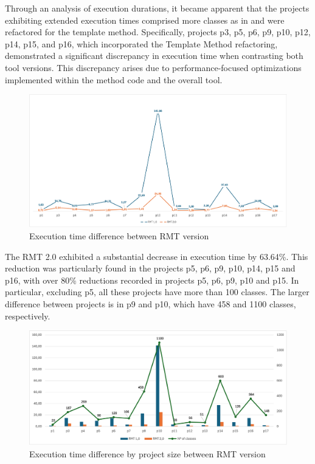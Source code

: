 

Through an analysis of execution durations, it became apparent that the projects exhibiting extended execution times comprised more classes as in  and were refactored for the template method. Specifically, projects p3, p5, p6, p9, p10, p12, p14, p15, and p16, which incorporated the Template Method refactoring, demonstrated a significant discrepancy in execution time when contrasting both tool versions. This discrepancy arises due to performance-focused optimizations implemented within the method code and the overall tool.

\begin{figure}[ht!]
\caption{Execution time difference between RMT version}
\label{fig-time-chart}
\includegraphics[width =\textwidth]{Chapter-5/Figures/time-diff.png}
\end{figure}
\FloatBarrier

The RMT 2.0 exhibited a substantial decrease in execution time by 63.64\%. This reduction was particularly found in the projects p5, p6, p9, p10, p14, p15 and p16, with over 80\% reductions recorded in projects p5, p6, p9, p10 and p15. In particular, excluding p5, all these projects have more than 100 classes. The larger difference between projects is in p9 and p10, which have 458 and 1100 classes, respectively. 

\begin{figure}[ht!]
\caption{Execution time difference by project size between RMT version}
\label{fig-time-by-size}
\includegraphics[width =\textwidth]{Chapter-5/Figures/time-per-project-size.png}
\end{figure}
\FloatBarrier


